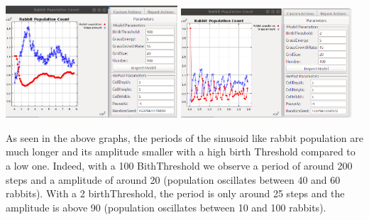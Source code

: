 \documentclass[11pt]{article}
\begin{document}
 \includegraphics[width=0.48\textwidth]{slow_sinusoid.png}
 \includegraphics[width=0.48\textwidth]{fast_sinusoid.png}
 
 As seen in the above graphs, the periods of the sinusoid like rabbit population are much longer and its amplitude smaller with a high birth Threshold compared to a low one. Indeed, with a 100 BithThreshold we observe a period of around 200 steps and a amplitude of around 20 (population oscillates between 40 and 60 rabbits). With a 2 birthThreshold, the period is only  around 25 steps and the amplitude is above 90 (population oscillates between 10 and 100 rabbits).
\end{document}
